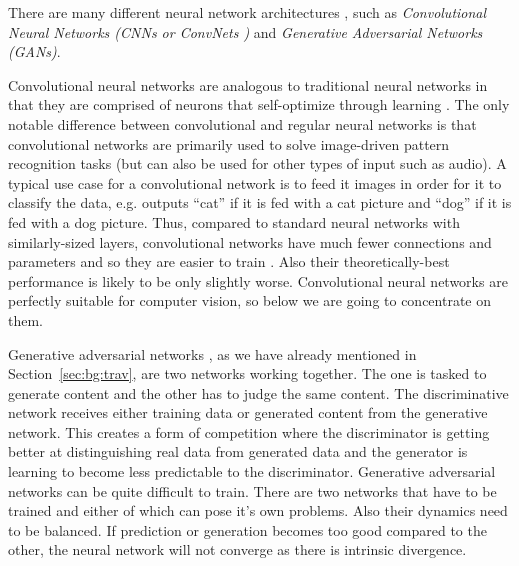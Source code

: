 \documentclass[12pt,a4paper]{report}
\newcommand{\alleg}{\enquote}
\newcommand{\term}{\textit}
\newcommand{\acronym}{\MakeUppercase}
\begin{document}
	There are many different neural network architectures \citep{Veen}, such as 
	\term{Convolutional Neural Networks (\acronym{cnn}s or ConvNets \citep{vgg})} 
	and \term{Generative Adversarial Networks (\acronym{gan}s)}.
	\par
	Convolutional neural networks are analogous to traditional neural networks in 
	that they are comprised of neurons that self-optimize through learning \citep{Shea}. 
	The only notable difference between convolutional and regular neural networks is 
	that convolutional networks are primarily used to solve image-driven pattern 
	recognition tasks (but can also be used for other types of input such as audio). 
	A typical use case for a convolutional network is to feed it images in order for 
	it to classify the data, e.g. outputs \alleg{cat} if it is fed with a cat picture 
	and \alleg{dog} if it is fed with a dog picture. Thus, compared to standard neural 
	networks with similarly-sized layers, convolutional networks have much fewer 
	connections and parameters and so they are easier to train \citep{alexnet}. Also 
	their theoretically-best performance is likely to be only slightly worse. 
	Convolutional neural networks are perfectly suitable for computer vision, so 
	below we are going to concentrate on them.
	\par
	Generative adversarial networks \citep{Goodfellow}, as we have already mentioned 
	in Section~\ref{sec:bg:trav}, are two networks working together. The one is tasked 
	to generate content and the other has to judge the same content. The discriminative 
	network receives either training data or generated content from the generative 
	network. This creates a form of competition where the discriminator is getting 
	better at distinguishing real data from generated data and the generator is 
	learning to become less predictable to the discriminator. Generative adversarial 
	networks can be quite difficult to train. There are two networks that have to be 
	trained and either of which can pose it’s own problems. Also their dynamics need 
	to be balanced. If prediction or generation becomes too good compared to the other, 
	the neural network will not converge as there is intrinsic divergence.
	\\
	
\end{document}
